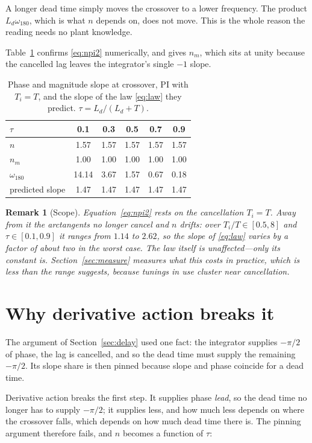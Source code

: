 \documentclass[final,3p,times,twocolumn]{elsarticle}
\newtheorem{remark}{Remark}
\begin{document}
A longer dead time simply moves the crossover to a lower frequency. The
product $L_d\omega_{180}$, which is what $n$ depends on, does not move.
This is the whole reason the reading needs no plant knowledge.

Table~\ref{tab:nphi} confirms \eqref{eq:npi2} numerically, and gives
$n_m$, which sits at unity because the cancelled lag leaves the
integrator's single $-1$ slope.

\begin{table}[t]
\centering
\caption{Phase and magnitude slope at crossover, PI with $T_i=T$, and
the slope of the law \eqref{eq:law} they predict. $\tau=L_d/(L_d+T)$.}
\label{tab:nphi}
\begin{tabular}{lccccc}
\toprule
$\tau$ & 0.1 & 0.3 & 0.5 & 0.7 & 0.9 \\
\midrule
$n$   & 1.57 & 1.57 & 1.57 & 1.57 & 1.57 \\
$n_m$ & 1.00 & 1.00 & 1.00 & 1.00 & 1.00 \\
$\omega_{180}$ & 14.14 & 3.67 & 1.57 & 0.67 & 0.18 \\
predicted slope & 1.47 & 1.47 & 1.47 & 1.47 & 1.47 \\
\bottomrule
\end{tabular}
\end{table}

\begin{remark}[Scope]
\label{rem:scope}
Equation~\eqref{eq:npi2} rests on the cancellation $T_i=T$. Away from
it the arctangents no longer cancel and $n$ drifts: over
$T_i/T\in[0.5,8]$ and $\tau\in[0.1,0.9]$ it ranges from $1.14$ to
$2.62$, so the slope of \eqref{eq:law} varies by a factor of about two
in the worst case. The law itself is unaffected---only its constant is.
Section~\ref{sec:measure} measures what this costs in practice, which is
less than the range suggests, because tunings in use cluster near
cancellation.
\end{remark}

\section{Why derivative action breaks it}
\label{sec:pid}

The argument of Section~\ref{sec:delay} used one fact: the integrator
supplies $-\pi/2$ of phase, the lag is cancelled, and so the dead time
must supply the remaining $-\pi/2$. Its slope share is then pinned
because slope and phase coincide for a dead time.

Derivative action breaks the first step. It supplies phase \emph{lead},
so the dead time no longer has to supply $-\pi/2$; it supplies less, and
how much less depends on where the crossover falls, which depends on how
much dead time there is. The pinning argument therefore fails, and $n$
becomes a function of $\tau$:
\end{document}
